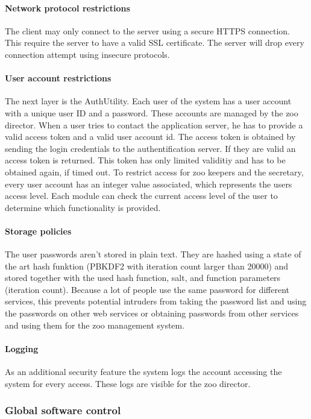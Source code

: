 			\paragraph{Network protocol restrictions}
				The client may only connect to the server using a secure HTTPS connection. This require the server to have a valid SSL certificate. The server will drop every connection attempt using insecure protocols.
			\paragraph{User account restrictions}
				The next layer is the AuthUtility. Each user of the system has a user account with a unique user ID and a password. These accounts are managed by the zoo director. When a user tries to contact the application server, he has to provide a valid access token and a valid user account id. The access token is obtained by sending the login credentials to the authentification server. If they are valid an access token is returned. This token has only limited validitiy and has to be obtained again, if timed out. To restrict access for zoo keepers and the secretary, every user account has an integer value associated, which represents the users access level. Each module can check the current access level of the user to determine which functionality is provided.
			\paragraph{Storage policies}
				The user passwords aren't stored in plain text. They are hashed using a state of the art hash funktion (PBKDF2 with iteration count larger than 20000) and stored together with the used hash function, salt, and function parameters (iteration count). Because a lot of people use the same password for different services, this prevents potential intruders from taking the password list and using the passwords on other web services or obtaining passwords from other services and using them for the zoo management system.
			\paragraph{Logging}
				As an additional security feature the system logs the account accessing the system for every access. These logs are visible for the zoo director.
				
		\subsubsection{Global software control}

